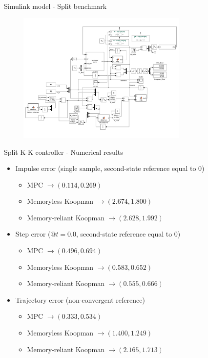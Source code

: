 \documentclass{beamer}
\begin{document}
\begin{frame}{Simulink model - Split benchmark}
    \begin{figure}
        \centering
        \includegraphics[width=0.75\textwidth]{Simulink_Split.png}
    \end{figure}
\end{frame}

\begin{frame}{Split K-K controller - Numerical results}
    \begin{itemize}
        \item Impulse error (single sample, second-state reference equal to 0)
            \begin{itemize}
                \item MPC $\rightarrow \left(0.114,0.269\right)$
                \item Memoryless Koopman $\rightarrow \left(2.674,1.800\right)$
                \item Memory-reliant Koopman $\rightarrow \left(2.628,1.992\right)$
            \end{itemize}
        \item Step error ($@t=0.0$, second-state reference equal to 0)
            \begin{itemize}
                \item MPC $\rightarrow \left(0.496,0.694\right)$
                \item Memoryless Koopman $\rightarrow \left(0.583,0.652\right)$
                \item Memory-reliant Koopman $\rightarrow \left(0.555,0.666\right)$
            \end{itemize}
        \item Trajectory error (non-convergent reference)
            \begin{itemize}
                \item MPC $\rightarrow \left(0.333,0.534\right)$
                \item Memoryless Koopman $\rightarrow \left(1.400,1.249\right)$
                \item Memory-reliant Koopman $\rightarrow \left(2.165,1.713\right)$
            \end{itemize}
    \end{itemize}
\end{frame}
\end{document}
